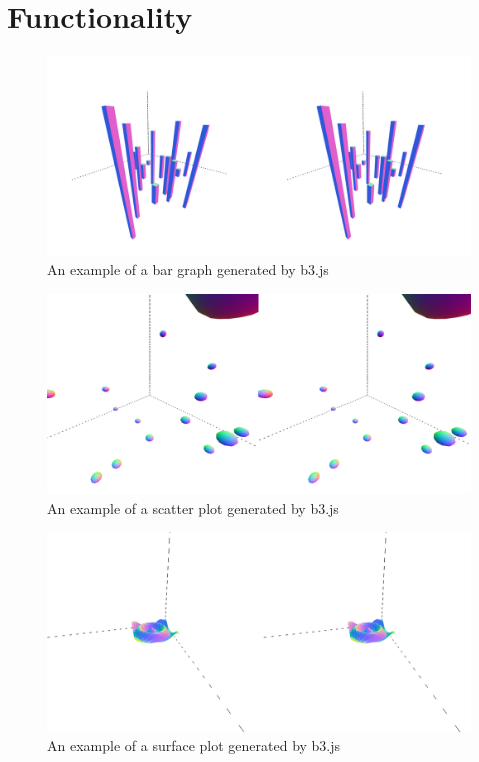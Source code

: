 \documentclass{vgtc}                          %
\begin{document}
\section{Functionality}

\begin{figure}[t]
\begin{center}
   \includegraphics[width=0.75\linewidth]{figure4}
\end{center}
   \caption{An example of a bar graph generated by b3.js}
\end{figure}

\begin{figure}[t]
\begin{center}
   \includegraphics[width=0.75\linewidth]{figure5}
\end{center}
   \caption{An example of a scatter plot generated by b3.js}
\end{figure}

\begin{figure}[t]
\begin{center}
   \includegraphics[width=0.75\linewidth]{figure6}
\end{center}
   \caption{An example of a surface plot generated by b3.js}
\end{figure}
\end{document}
